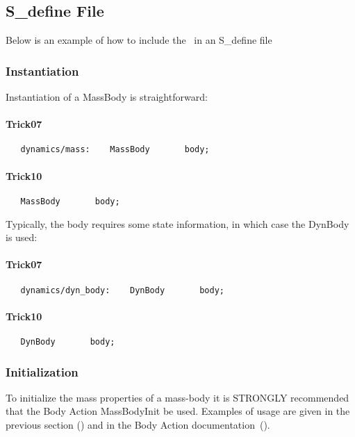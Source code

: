 \subsection{S\_define File}
Below is an example of how to include the \ModelDesc\ in an S\_define file
\subsubsection{Instantiation}

Instantiation of a MassBody is straightforward:

\paragraph{Trick07}
\begin{verbatim}
   dynamics/mass:    MassBody       body;
\end{verbatim}

\paragraph{Trick10}
\begin{verbatim}
   MassBody       body;
\end{verbatim}

Typically, the body requires some state information, in which case the 
DynBody is used:

\paragraph{Trick07}
\begin{verbatim}
   dynamics/dyn_body:    DynBody       body;
\end{verbatim}
\paragraph{Trick10}
\begin{verbatim}
   DynBody       body;
\end{verbatim}


\subsubsection{Initialization}
To initialize the mass properties of a mass-body it is STRONGLY recommended 
that the Body Action MassBodyInit be used.  Examples of usage are given in the 
previous section () and in the Body Action documentation~(\cite{dynenv:BODYACTION}).

